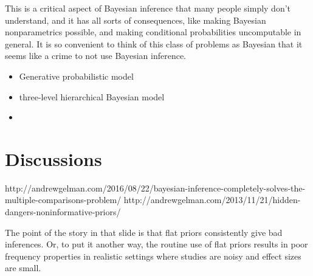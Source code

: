 \documentclass[11pt]{book}
\begin{document}
This is a critical aspect of Bayesian inference that many people simply don’t understand, and it has all sorts of consequences, like making Bayesian nonparametrics possible, and making conditional probabilities uncomputable in general. It is so convenient to think of this class of problems as Bayesian that it seems like a crime to not use Bayesian inference.


\begin{itemize}
	\item Generative probabilistic model
	\item three-level hierarchical Bayesian model
	\item 
\end{itemize}


\section{Discussions}

http://andrewgelman.com/2016/08/22/bayesian-inference-completely-solves-the-multiple-comparisons-problem/
http://andrewgelman.com/2013/11/21/hidden-dangers-noninformative-priors/

The point of the story in that slide is that flat priors consistently give bad inferences. Or, to put it another way, the routine use of flat priors results in poor frequency properties in realistic settings where studies are noisy and effect sizes are small.
\label{sec:}

\end{document}
